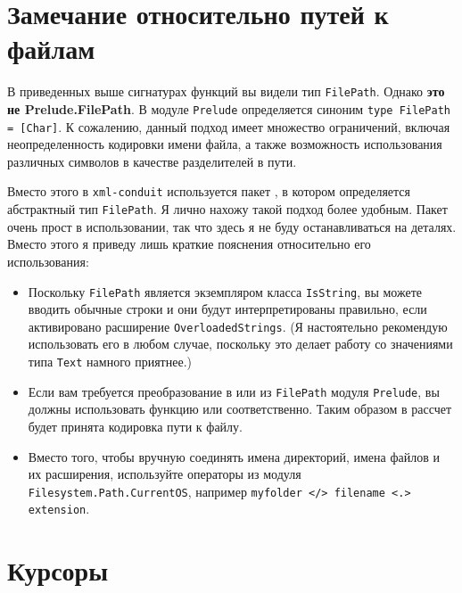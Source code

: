 \section{Замечание относительно путей к файлам} %

В приведенных выше сигнатурах функций вы видели тип \lstinline!FilePath!. Однако {\bf это не Prelude.FilePath}. В модуле \lstinline!Prelude! определяется синоним \lstinline!type FilePath = [Char]!. К сожалению, данный подход имеет множество ограничений, включая неопределенность кодировки имени файла, а также возможность использования различных символов в качестве разделителей в пути.

Вместо этого в \lstinline!xml-conduit! используется пакет , в котором определяется абстрактный тип \lstinline!FilePath!. Я лично нахожу такой подход более удобным. Пакет очень прост в использовании, так что здесь я не буду останавливаться на деталях. Вместо этого я приведу лишь краткие пояснения относительно его использования:

\begin{itemize}
\item Поскольку \lstinline!FilePath! является экземпляром класса \lstinline!IsString!, вы можете вводить обычные строки и они будут интерпретированы правильно, если активировано расширение \lstinline!OverloadedStrings!. (Я настоятельно рекомендую использовать его в любом случае, поскольку это делает работу со значениями типа \lstinline!Text! намного приятнее.)
\item Если вам требуется преобразование в или из \lstinline!FilePath! модуля \lstinline!Prelude!, вы должны использовать функцию  или  соответственно. Таким образом в рассчет будет принята кодировка пути к файлу.
\item Вместо того, чтобы вручную соединять имена директорий, имена файлов и их расширения, используйте операторы из модуля \lstinline!Filesystem.Path.CurrentOS!, например \lstinline!myfolder </> filename <.> extension!.
\end{itemize}
  
\section{Курсоры} %

